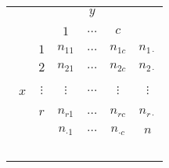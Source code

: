 
\begin{center}
\begin{tabular}{cc|ccc|c} 
    &           &                &  $y$      &          &  \\\
    &           &    $1$         &  $\dots$  &   $c$    & \\ \hline
    &    $1$    &  $n_{11}$      &  $\dots$  &  $n_{1c}$  &  $n_{1 \cdot}$ \\\
    &    $2$    &  $n_{21}$      &  $\dots$  &  $n_{2c}$  &  $n_{2 \cdot}$ \\\
$x$ & $\vdots$  &  $\vdots$      &  $\dots$  &  $\vdots$  &  $\vdots$ \\\     
    &    $r$      &  $n_{r1}$      &  $\dots$  &  $n_{rc}$  &  $n_{r \cdot}$ \\ \hline
    &           &  $n_{\cdot 1}$  &  $\dots$  &  $n_{\cdot c}$  &  $n$ \\\ 
\end{tabular}
\end{center}